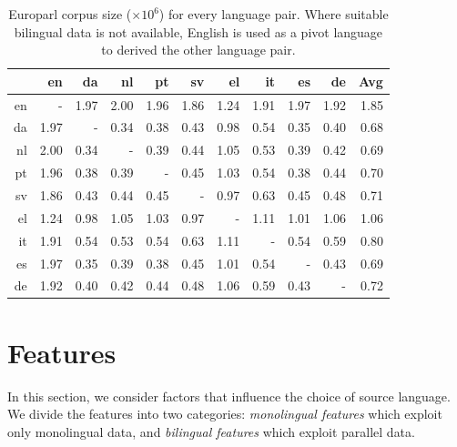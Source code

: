 \begin{table}[htbp]
  \centering

    \begin{tabular}{r|rrrrrrrrr|r}
          & en    & da    & nl    & pt    & sv    & el    & it    & es    & de    & Avg \\\hline

    en    & -     & 1.97  & 2.00  & 1.96  & 1.86  & 1.24  & 1.91  & 1.97  & 1.92  & 1.85 \\
    da    & 1.97  & -     & 0.34  & 0.38  & 0.43  & 0.98  & 0.54  & 0.35  & 0.40  & 0.68 \\
    nl    & 2.00  & 0.34  & -     & 0.39  & 0.44  & 1.05  & 0.53  & 0.39  & 0.42  & 0.69 \\
    pt    & 1.96  & 0.38  & 0.39  & -     & 0.45  & 1.03  & 0.54  & 0.38  & 0.44  & 0.70 \\
    sv    & 1.86  & 0.43  & 0.44  & 0.45  & -     & 0.97  & 0.63  & 0.45  & 0.48  & 0.71 \\
    el    & 1.24  & 0.98  & 1.05  & 1.03  & 0.97  & -     & 1.11  & 1.01  & 1.06  & 1.06 \\
    it    & 1.91  & 0.54  & 0.53  & 0.54  & 0.63  & 1.11  & -     & 0.54  & 0.59  & 0.80 \\
    es    & 1.97  & 0.35  & 0.39  & 0.38  & 0.45  & 1.01  & 0.54  & -     & 0.43  & 0.69 \\
    de    & 1.92  & 0.40  & 0.42  & 0.44  & 0.48  & 1.06  & 0.59  & 0.43  & -     & 0.72 \\

    \end{tabular}%
  \caption{Europarl corpus size ($\times 10^6$) for every language pair. Where suitable bilingual data is not available, English is used as a pivot language to derived the other language pair.}
  \label{tab:europarlCorpusSize}%
\end{table}%


\section{Features}
\label{featuresSec}
In this section, we consider factors that influence the choice of source language. We divide the features into two categories: \textit{monolingual features} which exploit only monolingual data, and \textit{bilingual features} which exploit parallel data. 

